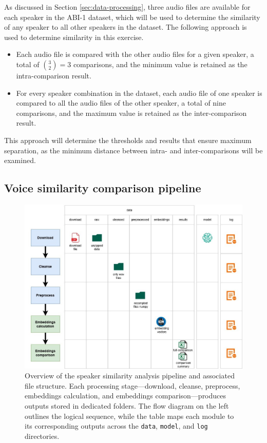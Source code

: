\documentclass[conference]{IEEEtran}
\begin{document}
	As discussed in Section \ref{sec:data-processing}, three audio files are available for each speaker in the ABI-1 dataset, which will be used to determine the similarity of any speaker to all other speakers in the dataset. The following approach is used to determine similarity in this exercise.
	\begin{itemize}
		\item Each audio file is compared with the other audio files for a given speaker, a total of $\binom{3}{2} = 3$ comparisons, and the minimum value is retained as the intra-comparison result.
		\item For every speaker combination in the dataset, each audio file of one speaker is compared to all the audio files of the other speaker, a total of nine comparisons, and the maximum value is retained as the inter-comparison result.
	\end{itemize}
	
	This approach will determine the thresholds and results that ensure maximum separation, as the minimum distance between intra- and inter-comparisons will be examined.
	
	
	\subsection{Voice similarity comparison pipeline}
	
	\begin{figure}[H]
		\centering
		\includegraphics[width=1\linewidth]{img/img-pipeline}
		\caption{Overview of the speaker similarity analysis pipeline and associated file structure. Each processing stage—download, cleanse, preprocess, embeddings calculation, and embeddings comparison—produces outputs stored in dedicated folders. The flow diagram on the left outlines the logical sequence, while the table maps each module to its corresponding outputs across the \texttt{data}, \texttt{model}, and \texttt{log} directories.}	
		\label{fig:img-pipeline}
	\end{figure}
	
\end{document}
